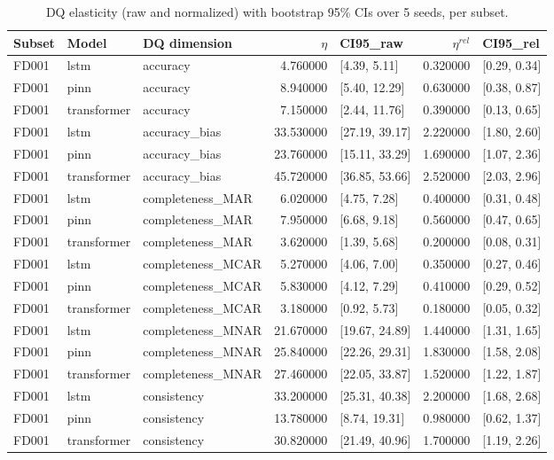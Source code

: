 \begin{table}
\caption{DQ elasticity (raw and normalized) with bootstrap 95\% CIs over 5 seeds, per subset.}
\label{tab:B_elasticity}
\begin{tabular}{lllrlrl}
\toprule
Subset & Model & DQ dimension & $\eta$ & CI95_raw & $\eta^{rel}$ & CI95_rel \\
\midrule
FD001 & lstm & accuracy & 4.760000 & [4.39, 5.11] & 0.320000 & [0.29, 0.34] \\
FD001 & pinn & accuracy & 8.940000 & [5.40, 12.29] & 0.630000 & [0.38, 0.87] \\
FD001 & transformer & accuracy & 7.150000 & [2.44, 11.76] & 0.390000 & [0.13, 0.65] \\
FD001 & lstm & accuracy\_bias & 33.530000 & [27.19, 39.17] & 2.220000 & [1.80, 2.60] \\
FD001 & pinn & accuracy\_bias & 23.760000 & [15.11, 33.29] & 1.690000 & [1.07, 2.36] \\
FD001 & transformer & accuracy\_bias & 45.720000 & [36.85, 53.66] & 2.520000 & [2.03, 2.96] \\
FD001 & lstm & completeness\_MAR & 6.020000 & [4.75, 7.28] & 0.400000 & [0.31, 0.48] \\
FD001 & pinn & completeness\_MAR & 7.950000 & [6.68, 9.18] & 0.560000 & [0.47, 0.65] \\
FD001 & transformer & completeness\_MAR & 3.620000 & [1.39, 5.68] & 0.200000 & [0.08, 0.31] \\
FD001 & lstm & completeness\_MCAR & 5.270000 & [4.06, 7.00] & 0.350000 & [0.27, 0.46] \\
FD001 & pinn & completeness\_MCAR & 5.830000 & [4.12, 7.29] & 0.410000 & [0.29, 0.52] \\
FD001 & transformer & completeness\_MCAR & 3.180000 & [0.92, 5.73] & 0.180000 & [0.05, 0.32] \\
FD001 & lstm & completeness\_MNAR & 21.670000 & [19.67, 24.89] & 1.440000 & [1.31, 1.65] \\
FD001 & pinn & completeness\_MNAR & 25.840000 & [22.26, 29.31] & 1.830000 & [1.58, 2.08] \\
FD001 & transformer & completeness\_MNAR & 27.460000 & [22.05, 33.87] & 1.520000 & [1.22, 1.87] \\
FD001 & lstm & consistency & 33.200000 & [25.31, 40.38] & 2.200000 & [1.68, 2.68] \\
FD001 & pinn & consistency & 13.780000 & [8.74, 19.31] & 0.980000 & [0.62, 1.37] \\
FD001 & transformer & consistency & 30.820000 & [21.49, 40.96] & 1.700000 & [1.19, 2.26] \\

\end{tabular}
\end{table}
